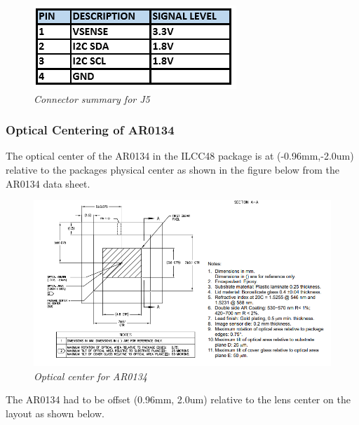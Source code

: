 \documentclass[11pt]{article}
\begin{document}
    \begin{figure}[H]
	\centering	
	\includegraphics[width=3 in]{CONN_J5}
	\caption{\textit{Connector summary for J5}}	
	\end{figure}


\subsubsection{Optical Centering of AR0134}
The optical center of the AR0134 in the ILCC48 package is at (-0.96mm,-2.0um) relative to the packages physical center as shown in the figure below from the AR0134 data sheet.


    \begin{figure}[H]
	\centering	
	\includegraphics[width=7 in]{opcenter}
	\caption{\textit{Optical center for AR0134}}	
	\end{figure}

\newpage

The AR0134 had to be offset (0.96mm, 2.0um) relative to the lens center on the layout as shown below.
\end{document}
